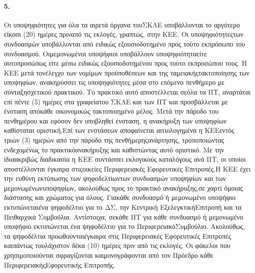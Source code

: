 \documentclass[a4paper,oneside, 10pt]{book}
\begin{document}
\paragraph { 5. } Οι υποψηφιότητες για όλα τα αιρετά όργανα τουΣΚΛΕ υποβάλλονται το αργότερο είκοσι (20) ημέρες πριναπό τις εκλογές, γραπτώς, στην ΚΕΕ. Οι υποψηφιότητεςτων συνδυασμών υποβάλλονται από ειδικώς εξουσιοδοτημένο προς τούτο εκπρόσωπο του συνδυασμού. Οιμεμονωμένοι υποψήφιοι υποβάλλουν υποψηφιότηταείτε αυτοπροσώπως είτε μέσω ειδικώς εξουσιοδοτημένου προς τούτο εκπροσώπου τους. Η ΚΕΕ μετά τονέλεγχο των νομίμων προϋποθέσεων και της ταμειακήςτακτοποίησης των υποψηφίων, ανακηρύσσει τις υποψηφιότητες μέσα στο επόμενο πενθήμερο με σύνταξησχετικού πρακτικού. Το πρακτικό αυτό αποστέλλεται σεόλα τα ΠΤ, αναρτάται επί πέντε (5) ημέρες στα γραφείατου ΣΚΛΕ και των ΠΤ και προσβάλλεται με ένσταση απόκάθε οικονομικώς τακτοποιημένο μέλος. Μετά την πάροδο του πενθημέρου και εφόσον δεν υποβληθεί ένσταση, η ανακήρυξη των υποψηφίων καθίσταται οριστική.Επί των ενστάσεων αποφαίνεται αιτιολογημένα η ΚΕΕεντός τριών (3) ημερών από την πάροδο της πενθήμερηςανάρτησης, τροποποιώντας ενδεχομένως το πρακτικόανακήρυξης και καθιστώντας αυτό οριστικό. Με την ίδιαακριβώς διαδικασία η ΚΕΕ συντάσσει εκλογικούς καταλόγους ανά ΠΤ, οι οποίοι αποστέλλονται έγκαιρα στιςοικείες Περιφερειακές Εφορευτικές Επιτροπές.Η ΚΕΕ έχει την ευθύνη εκτύπωσης των ψηφοδελτίωντων συνδυασμών υποψηφίων και των μεμονωμένωνυποψηφίων, ακολούθως προς το πρακτικό ανακήρυξης,σε χαρτί όμοιας διάστασης και χρώματος για όλους. Γιακάθε συνδυασμό ή μεμονωμένο υποψήφιο εκτυπώνεταιένα ψηφοδέλτιο για το ΔΣ, την Κεντρική ΕξελεγκτικήΕπιτροπή και τα Πειθαρχικά Συμβούλια. Αντίστοιχα, σεκάθε ΠΤ για κάθε συνδυασμό ή μεμονωμένο υποψήφιο εκτυπώνεται ένα ψηφοδέλτιο για το ΠεριφερειακόΣυμβούλιο. Ακολούθως, τα ψηφοδέλτια προωθούνταιέγκαιρα στις Περιφερειακές Εφορευτικές Επιτροπές καιπάντως τουλάχιστον δέκα (10) ημέρες πριν από τις εκλογές. Οι φάκελοι που χρησιμοποιούνται σφραγίζονται καιμονογράφονται από τον Πρόεδρο κάθε ΠεριφερειακήςΕφορευτικής Επιτροπής.
\end{document}
